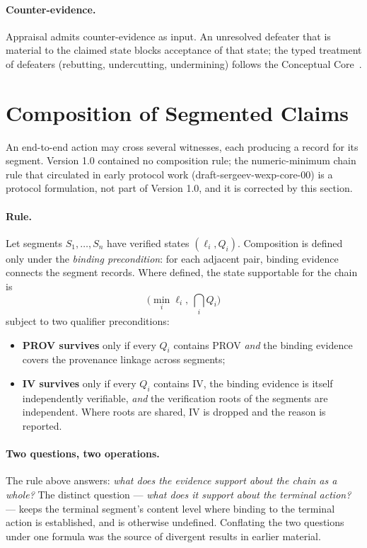 \documentclass[11pt]{article}
\begin{document}
\paragraph{Counter-evidence.} Appraisal admits counter-evidence as input. An unresolved defeater that is material to the claimed state blocks acceptance of that state; the typed treatment of defeaters (rebutting, undercutting, undermining) follows the Conceptual Core~\cite{wcc_core_2026}.

\section{Composition of Segmented Claims}
\label{sec:composition}

An end-to-end action may cross several witnesses, each producing a record for its segment. Version 1.0 contained no composition rule; the numeric-minimum chain rule that circulated in early protocol work (draft-sergeev-wexp-core-00) is a protocol formulation, not part of Version 1.0, and it is corrected by this section.

\paragraph{Rule.} Let segments $S_1,\ldots,S_n$ have verified states $(\ell_i, Q_i)$. Composition is defined only under the \emph{binding precondition}: for each adjacent pair, binding evidence connects the segment records. Where defined, the state supportable for the chain is
\[
\Big(\min_i \ell_i,\ \bigcap_i Q_i\Big)
\]
subject to two qualifier preconditions:
\begin{itemize}[leftmargin=*]
\item \textbf{PROV survives} only if every $Q_i$ contains PROV \emph{and} the binding evidence covers the provenance linkage across segments;
\item \textbf{IV survives} only if every $Q_i$ contains IV, the binding evidence is itself independently verifiable, \emph{and} the verification roots of the segments are independent. Where roots are shared, IV is dropped and the reason is reported.
\end{itemize}

\paragraph{Two questions, two operations.} The rule above answers: \emph{what does the evidence support about the chain as a whole?} The distinct question --- \emph{what does it support about the terminal action?} --- keeps the terminal segment's content level where binding to the terminal action is established, and is otherwise undefined. Conflating the two questions under one formula was the source of divergent results in earlier material.
\end{document}
